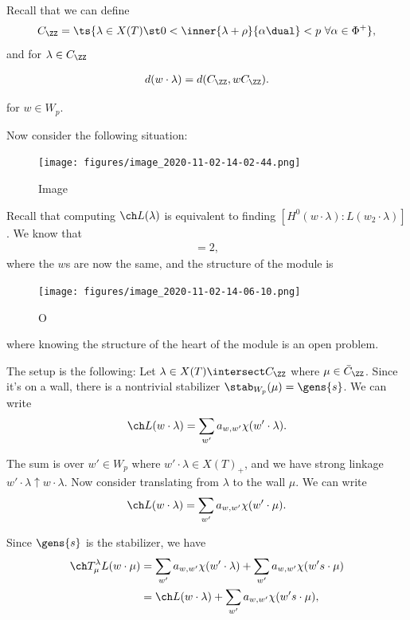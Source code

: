 Recall that we can define
\begin{align*}  
C_\ZZ = \ts{\lambda \in X(T) \st 0 < \inner{\lambda+\rho}{\alpha\dual}<p \,\, \forall \alpha\in\Phi^+ }
,\end{align*} and for \(\lambda \in C_\ZZ\)

\begin{align*}  
d(w\cdot \lambda) = d(C_\ZZ, wC_\ZZ)
.\end{align*}

for \(w\in W_p\).

Now consider the following situation:

\begin{figure}
\centering
\texttt{[image: figures/image\_2020-11-02-14-02-44.png]}
\caption{Image}
\end{figure}

Recall that computing \(\ch L(\lambda)\) is equivalent to finding
\([H^0(w\cdot \lambda): L(w_2\cdot \lambda)]\). We know that
\begin{align*}  
[T_\mu^\lambda (L(w\cdot\mu)) : L(w\cdot \mu)] = 2
,\end{align*} where the \(w\)s are now the same, and the structure of
the module is

\begin{figure}
\centering
\texttt{[image: figures/image\_2020-11-02-14-06-10.png]}
\caption{O}
\end{figure}

where knowing the structure of the heart of the module is an open
problem.

The setup is the following: Let \(\lambda\in X(T) \intersect C_\ZZ\)
where \(\mu \in \bar{C}_\ZZ\). Since it's on a wall, there is a
nontrivial stabilizer \(\stab_{W_p}(\mu) = \gens{s}\). We can write
\begin{align*}  
\ch L(w\cdot \lambda) = \sum_{w'} a_{w, w'} \chi(w' \cdot \lambda)
.\end{align*}

The sum is over \(w'\in W_p\) where \(w'\cdot \lambda \in X(T)_+\), and
we have strong linkage \(w'\cdot \lambda \uparrow w\cdot \lambda\). Now
consider translating from \(\lambda\) to the wall \(\mu\). We can write
\begin{align*}  
\ch L(w\cdot \lambda) = \sum_{w'} a_{w, w'} \chi(w' \cdot \mu)
.\end{align*}

Since \(\gens{s}\) is the stabilizer, we have
\begin{align*}  
\ch T_\mu^\lambda L(w\cdot \mu)
&= \sum_{w'} a_{w, w'} \chi(w' \cdot \lambda)
+ \sum_{w'} a_{w, w'} \chi(w's \cdot \mu) \\
&= \ch L(w\cdot \lambda)
+ \sum_{w'} a_{w, w'} \chi(w's \cdot \mu)
,\end{align*}

